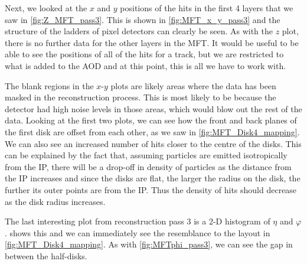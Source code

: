 \bigskip

Next, we looked at the $x$ and $y$ positions of the hits in the first 4 layers that we saw in \cref{fig:Z_MFT_pass3}. This is shown in \cref{fig:MFT_x_y_pass3} and the structure of the ladders of pixel detectors can clearly be seen. As with the $z$ plot, there is no further data for the other layers in the MFT. It would be useful to be able to see the positions of all of the hits for a track, but we are restricted to what is added to the AOD and at this point, this is all we have to work with. 

The blank regions in the $x$-$y$ plots are likely areas where the data has been masked in the reconstruction process. This is most likely to be because the detector had high noise levels in those areas, which would blow out the rest of the data. Looking at the first two plots, we can see how the front and back planes of the first disk are offset from each other, as we saw in \cref{fig:MFT_Disk4_mapping}. We can also see an increased number of hits closer to the centre of the disks. This can be explained by the fact that, assuming particles are emitted isotropically from the IP, there will be a drop-off in density of particles as the distance from the IP increases and since the disks are flat, the larger the radius on the disk, the further its outer points are from the IP. Thus the density of hits should decrease as the disk radius increases. 

\bigskip

The last interesting plot from reconstruction pass 3 is a 2-D histogram of $\eta$ and $\varphi$.  shows this and we can immediately see the resemblance to the layout in \cref{fig:MFT_Disk4_mapping}. As with \cref{fig:MFTphi_pass3}, we can see the gap in between the half-disks. 

